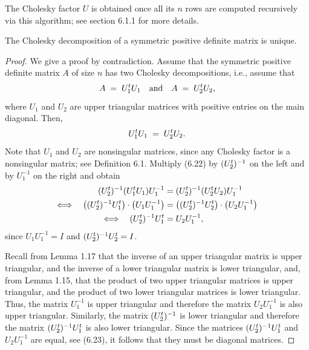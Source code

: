 The Cholesky factor $U$ is obtained once all its $n$ rows are computed recursively via
this algorithm; see section 6.1.1 for more details.

\begin{theorem}
The Cholesky decomposition of a symmetric positive definite matrix is unique.
\end{theorem}

\begin{proof}
We give a proof by contradiction. Assume that the symmetric positive definite matrix
$A$ of size $n$ has two Cholesky decompositions, i.e., assume that
\[
A \;=\; U_1^{t} U_1 \quad \text{and} \quad A \;=\; U_2^{t} U_2,
\]
where $U_1$ and $U_2$ are upper triangular matrices with positive entries on the main
diagonal. Then,
\begin{equation}
U_1^{t} U_1 \;=\; U_2^{t} U_2.
\end{equation}
Note that $U_1$ and $U_2$ are nonsingular matrices, since any Cholesky factor is a
nonsingular matrix; see Definition 6.1. Multiply (6.22) by $(U_2^{t})^{-1}$ on the left
and by $U_1^{-1}$ on the right and obtain
\begin{align}
(U_2^{t})^{-1}(U_1^{t} U_1)U_1^{-1} &= (U_2^{t})^{-1}(U_2^{t} U_2)U_1^{-1} \notag \\
\Longleftrightarrow \quad \big((U_2^{t})^{-1}U_1^{t}\big) \cdot \big(U_1 U_1^{-1}\big)
&= \big((U_2^{t})^{-1}U_2^{t}\big) \cdot \big(U_2 U_1^{-1}\big) \notag \\
\Longleftrightarrow \quad (U_2^{t})^{-1}U_1^{t} &= U_2 U_1^{-1},
\end{align}
since $U_1U_1^{-1} = I$ and $(U_2^{t})^{-1}U_2^{t} = I$.

Recall from Lemma 1.17 that the inverse of an upper triangular matrix is upper
triangular, and the inverse of a lower triangular matrix is lower triangular, and, from
Lemma 1.15, that the product of two upper triangular matrices is upper triangular, and
the product of two lower triangular matrices is lower triangular. Thus, the matrix
$U_1^{-1}$ is upper triangular and therefore the matrix $U_2U_1^{-1}$ is also upper
triangular. Similarly, the matrix $(U_2^{t})^{-1}$ is lower triangular and therefore the
matrix $(U_2^{t})^{-1}U_1^{t}$ is also lower triangular. Since the matrices
$(U_2^{t})^{-1}U_1^{t}$ and $U_2U_1^{-1}$ are equal, see (6.23), it follows that they
must be diagonal matrices.


\end{proof}
